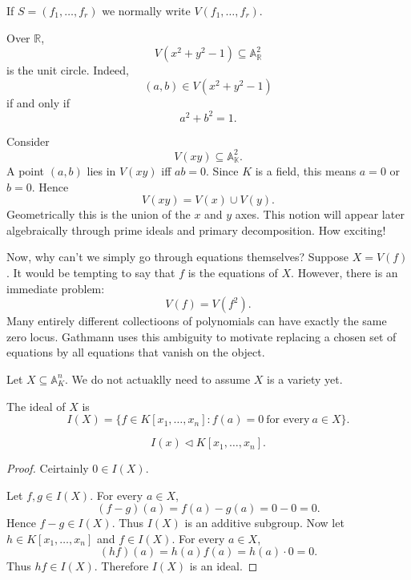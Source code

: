 \documentclass[11pt]{article}
\begin{document}
If $S = (f_1, \ldots, f_r)$ we normally write 
$V(f_1,\ldots,f_r)$. 

\begin{ex}
    Over $\mathbb R$, 
    \[
        V(x^2 + y^2 - 1) \subseteq \mathbb A^2_{\mathbb R}
    \]
    is the unit circle. 
    Indeed, 
    \[
        (a,b) \in V(x^2 + y^2 - 1)
    \]
    if and only if 
    \[ 
        a^2 + b^2 = 1. 
    \]
\end{ex}
\begin{ex}
    Consider 
    $$ 
        V(xy) \subseteq \mathbb A^2_{\mathbb K}.
    $$ 
    A point $(a,b)$ lies in $V(xy)$ iff 
    $ab = 0$. 
    Since $K$ is a field, this means 
    $a = 0$ or $b = 0$. 
    Hence 
    \[
        V(xy) = V(x) \cup V(y). 
    \]
    Geometrically this is the union of the $x$ and $y$ 
    axes. 
    This notion will appear later algebraically through 
    prime ideals and primary decomposition. How exciting!
\end{ex}

Now, why can't we simply go through equations themselves? 
Suppose $X = V(f)$. It would be tempting to say that 
$f$ is the equations of $X$. However, there is an immediate 
problem: 
\[
    V(f) = V(f^2). 
\]
Many entirely different collectioons of polynomials 
can have exactly the same zero locus. Gathmann uses 
this ambiguity to motivate replacing a 
chosen set of equations by all equations 
that vanish on the object. 

\begin{defn}
    Let $X \subseteq \mathbb A_K^n$. 
    We do not actuaklly need to assume $X$ is a variety 
    yet. 

    The ideal of $X$ is 
    \[
        I(X) = \{f \in K[x_1,\ldots,x_n] : f(a) = 0 \ 
        \text{for every} \ a \in X\}. 
    \]
\end{defn}

\begin{prop}
    \[
        I(x) \triangleleft K[x_1,\ldots,x_n]. 
    \]
\end{prop}
\begin{proof}
    Ceirtainly $0 \in I(X)$. 

    Let $f,g \in I(X)$. 
    For every $a\in X$, 
    \[ 
        (f-g)(a) = f(a) - g(a) = 0 - 0 = 0. 
    \]
    Hence $f - g \in I(X)$. 
    Thus $I(X)$ is an additive subgroup. 
    Now let $h \in K[x_1,\ldots,x_n]$ and 
    $f \in I(X)$. For every $a \in X$, 
    \[
        (hf)(a) = h(a)f(a) = h(a) \cdot 0 = 0. 
    \]
    Thus $hf \in I(X)$. 
    Therefore $I(X)$ is an ideal.
\end{proof}
\end{document}
